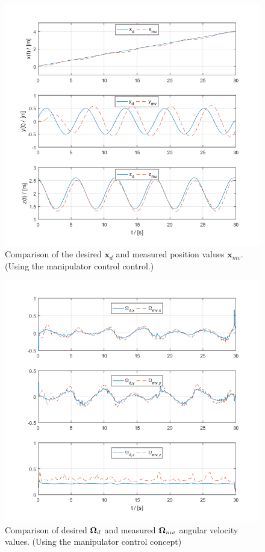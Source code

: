 \begin{figure}[h!]
	\centering
	\includegraphics[width=\columnwidth]{./pictures/manip_traj_pos.png}
	\caption{Comparison of the desired $\textbf{x}_d$ and measured position values $\textbf{x}_{mv}$. (Using the manipulator control control.)}
	\label{fig:manip_pos}
\end{figure}
\begin{figure}[h!]
	\centering
	\includegraphics[width=\columnwidth]{./pictures/manip_traj_omega.png}
	\caption{Comparison of desired $\boldsymbol{\Omega}_d$ and measured $\boldsymbol{\Omega}_{mv}$ angular velocity values. (Using the manipulator control concept)}
	\label{fig:manip_omega}
\end{figure}
